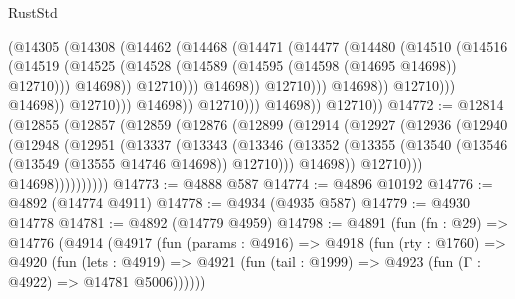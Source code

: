 \begin{lexlean}{RustStd}
\begin{coremodule}
                                        (@14305
                                          (@14308
                                            (@14462
                                              (@14468
                                                (@14471
                                                  (@14477
                                                    (@14480
                                                      (@14510
                                                        (@14516
                                                          (@14519
                                                            (@14525
                                                              (@14528
                                                                (@14589
                                                                  (@14595
                                                                    (@14598 (@14695 @14698))
                                                                    @12710)))
                                                              @14698))
                                                          @12710)))
                                                    @14698))
                                                @12710)))
                                          @14698))
                                      @12710)))
                                @14698))
                            @12710)))
                      @14698))
                  @12710)))
            @14698))
        @12710))
@14772 := @12814
    (@12855
      (@12857
        (@12859
          (@12876
            (@12899
              (@12914
                (@12927
                  (@12936
                    (@12940
                      (@12948
                        (@12951
                          (@13337
                            (@13343
                              (@13346
                                (@13352
                                  (@13355 (@13540 (@13546 (@13549 (@13555 @14746 @14698)) @12710)))
                                  @14698))
                              @12710)))
                        @14698))))))))))
@14773 := @4888 @587
@14774 := @4896 @10192
@14776 := @4892 (@14774 @4911)
@14778 := @4934 (@4935 @587)
@14779 := @4930 @14778
@14781 := @4892 (@14779 @4959)
@14798 := @4891
    (fun (fn : @29) =>
    @14776
      (@4914
        (@4917
          (fun (params : @4916) =>
          @4918
            (fun (rty : @1760) =>
            @4920
              (fun (lets : @4919) =>
              @4921 (fun (tail : @1999) => @4923 (fun (Γ : @4922) => @14781 @5006))))))

\end{coremodule}
\end{lexlean}
